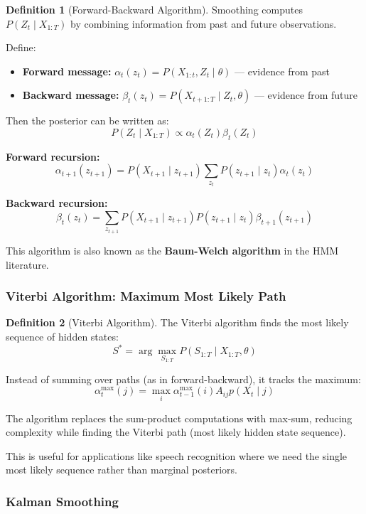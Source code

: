 \documentclass[12pt,a4paper]{article}
\theoremstyle{definition}
\newtheorem{definition}{Definition}[section]
\begin{document}
\begin{definition}[Forward-Backward Algorithm]
Smoothing computes $P(Z_t \mid X_{1:T})$ by combining information from past and future observations.

Define:
\begin{itemize}
    \item \textbf{Forward message:} $\alpha_t(z_t) = P(X_{1:t}, Z_t \mid \theta)$ — evidence from past
    \item \textbf{Backward message:} $\beta_t(z_t) = P(X_{t+1:T} \mid Z_t, \theta)$ — evidence from future
\end{itemize}

Then the posterior can be written as:
\[
P(Z_t \mid X_{1:T}) \propto \alpha_t(Z_t) \beta_t(Z_t)
\]

\textbf{Forward recursion:}
\[
\alpha_{t+1}(z_{t+1}) = P(X_{t+1} \mid z_{t+1}) \sum_{z_t} P(z_{t+1} \mid z_t) \alpha_t(z_t)
\]

\textbf{Backward recursion:}
\[
\beta_t(z_t) = \sum_{z_{t+1}} P(X_{t+1} \mid z_{t+1}) P(z_{t+1} \mid z_t) \beta_{t+1}(z_{t+1})
\]

This algorithm is also known as the \textbf{Baum-Welch algorithm} in the HMM literature.
\end{definition}

\subsubsection{Viterbi Algorithm: Maximum Most Likely Path}

\begin{definition}[Viterbi Algorithm]
The Viterbi algorithm finds the most likely sequence of hidden states:
\[
S^* = \arg\max_{S_{1:T}} P(S_{1:T} \mid X_{1:T}, \theta)
\]

Instead of summing over paths (as in forward-backward), it tracks the maximum:
\[
\alpha^{\max}_t(j) = \max_i \alpha^{\max}_{t-1}(i) A_{ij} p(X_t \mid j)
\]

The algorithm replaces the sum-product computations with max-sum, reducing complexity while finding the Viterbi path (most likely hidden state sequence).

This is useful for applications like speech recognition where we need the single most likely sequence rather than marginal posteriors.
\end{definition}

\subsubsection{Kalman Smoothing}
\end{document}
